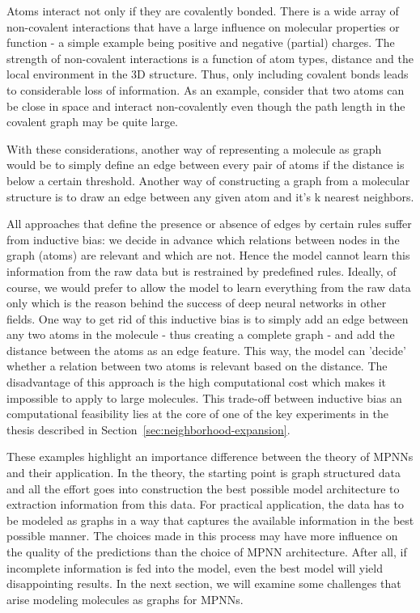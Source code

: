 Atoms interact not only if they are covalently bonded. There is a wide array of non-covalent interactions that have a large influence on molecular properties or function - a simple example being positive and negative (partial) charges. The strength of non-covalent interactions is a function of atom types, distance and the local environment in the 3D structure. Thus, only including covalent bonds leads to considerable loss of information. As an example, consider that two atoms can be close in space and interact non-covalently even though the path length in the covalent graph may be quite large.


With these considerations, another way of representing a molecule as graph would be to simply define an edge between every pair of atoms if the distance is below a certain threshold. Another way of constructing a graph from a molecular structure is to draw an edge between any given atom and it's k nearest neighbors.

All approaches that define the presence or absence of edges by certain rules suffer from inductive bias: we decide in advance which relations between nodes in the graph (atoms) are relevant and which are not. Hence the model cannot learn this information from the raw data but is restrained by predefined rules. Ideally, of course, we would prefer to allow the model to learn everything from the raw data only which is the reason behind the success of deep neural networks in other fields. One way to get rid of this inductive bias is to simply add an edge between any two atoms in the molecule - thus creating a complete graph - and add the distance between the atoms as an edge feature. This way, the model can 'decide' whether a relation between two atoms is relevant based on the distance. The disadvantage of this approach is the high computational cost which makes it impossible to apply to large molecules. This trade-off between inductive bias an computational feasibility lies at the core of one of the key experiments in the thesis described in Section~\ref{sec:neighborhood-expansion}.

%

These examples highlight an importance difference between the theory of MPNNs and their application. In the theory, the starting point is graph structured data and all the effort goes into construction the best possible model architecture to extraction information from this data. For practical application, the data has to be modeled as graphs in a way that captures the available information in the best possible manner. The choices made in this process may have more influence on the quality of the predictions than the choice of MPNN architecture. After all, if incomplete information is fed into the model, even the best model will yield disappointing results. In the next section, we will examine some challenges that arise modeling molecules as graphs for MPNNs.


